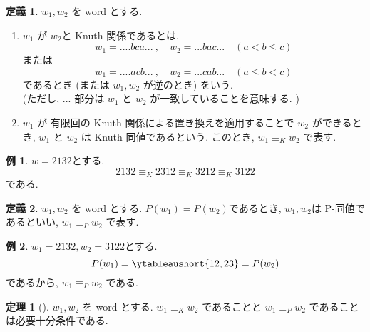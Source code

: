 \documentclass[
  a4paper, 
  12pt,
  ja=standard,
  xelatex,
  left=30truemm,
  right=30truemm,
  titlepage 
]{bxjsarticle}
\theoremstyle{definition}
\newtheorem{df}{定義}[section]
\newtheorem{thm}{定理}[section]
\newtheorem*{ex}{例}
\begin{document}
\begin{df} $w_1, w_2$ を word とする.
  \begin{enumerate}
    \item $w_1$ が $w_2$と Knuth 関係であるとは,  
    $$ w_1 = ....bca... \ , \quad w_2 = ...bac... \quad (a < b \leq c)$$
    または
    $$ w_1 = ....acb... \ , \quad w_2 = ...cab... \quad (a \leq b < c)$$
    であるとき (または $w_1, w_2$ が逆のとき) をいう. \\
    (ただし, $...$ 部分は $w_1$ と $w_2$ が一致していることを意味する. )
    \item $w_1$ が 有限回の Knuth 関係による置き換えを適用することで $w_2$ ができるとき,
    $w_1$ と $w_2$ は Knuth 同値であるという. このとき, $w_1 \equiv_{K} w_2$ で表す.
  \end{enumerate}
\end{df}

\begin{ex}
  $w = 2 1 3 2$とする.
  \[
    2 1 3 2 \equiv_{K} 2 3 1 2 \equiv_{K} 3 2 1 2 \equiv_{K} 3 1 2 2
  \]
  である.
\end{ex}

\begin{df}
  $w_1, w_2$ を word とする.
  $P(w_1) = P(w_2) $であるとき, $w_1, w_2$は P-同値であるといい, $w_1 \equiv_{P} w_2 $ で表す.
\end{df}

\begin{ex}
  $w_1 = 2 1 3 2, w_2 = 3 1 2 2 $とする.
  $$ P(w_1) = \ytableaushort{12,23} = P(w_2) $$
  であるから, $w_1 \equiv_{P} w_2 $ である.
\end{ex}

\begin{thm} [{\cite[定理3.4.3]{b1}}] \label{k-p-equiv}
  $w_1, w_2$ を word とする.
  $w_1 \equiv_{K} w_2$ であることと $w_1 \equiv_{P} w_2 $ であることは必要十分条件である.
\end{thm}
\end{document}
